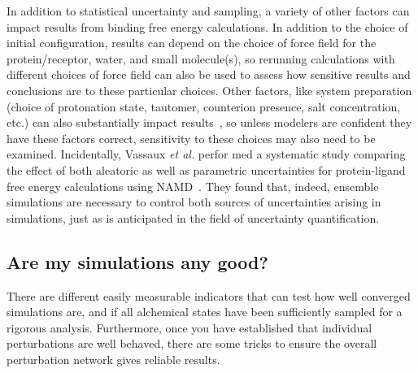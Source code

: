 \documentclass[9pt,bestpractices]{livecoms}
\begin{document}
In addition to statistical uncertainty and sampling, a variety of other factors can impact results from binding free energy calculations. In addition to the choice of initial configuration, results can depend on the choice of force field for the protein/receptor, water, and small molecule(s), so rerunning calculations with different choices of force field can also be used to assess how sensitive results and conclusions are to these particular choices. Other factors, like system preparation (choice of protonation state, tautomer, counterion presence, salt concentration, etc.) can also substantially impact results~\cite{mobley2017predicting, mobley2017predictinga}, so unless modelers are confident they have these factors correct, sensitivity to these choices may also need to be examined.
Incidentally, Vassaux \textit{et al.} perfor med a systematic study comparing the effect of both aleatoric as well as parametric uncertainties for protein-ligand free energy calculations using NAMD~\cite{vassaux2021}. They found that, indeed, ensemble simulations are necessary to control both sources of uncertainties arising in simulations, just as is anticipated in the field of uncertainty quantification.

\subsection{Are my simulations any good?}
\label{sec:are-they-good}
There are different easily measurable indicators that can test how well converged simulations are, and if all alchemical states have been sufficiently sampled for a rigorous analysis. Furthermore, once you have established that individual perturbations are well behaved, there are some tricks to ensure the overall perturbation network gives reliable results.
\end{document}
